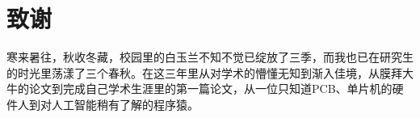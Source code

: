 \chapter{致谢}\label{acknowledgement}

寒来暑往，秋收冬藏，校园里的白玉兰不知不觉已绽放了三季，而我也已在研究生的时光里荡漾了三个春秋。在这三年里从对学术的懵懂无知到渐入佳境，从膜拜大牛的论文到完成自己学术生涯里的第一篇论文，从一位只知道PCB、单片机的硬件人到对人工智能稍有了解的程序猿。


\cleardoublepage[plain]%
